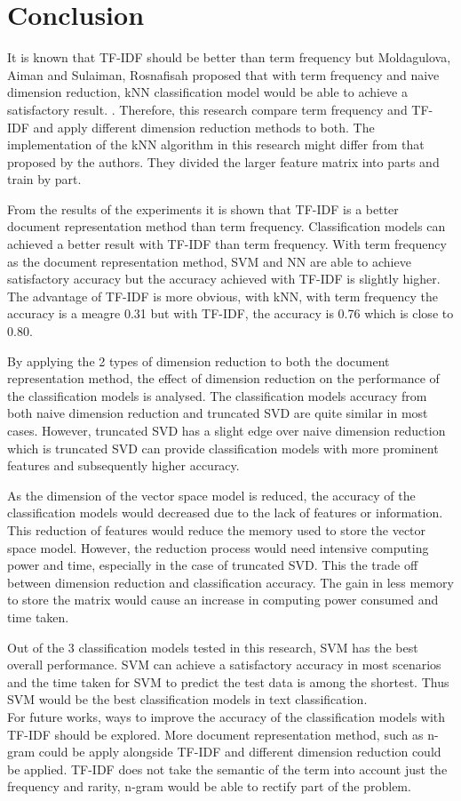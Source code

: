 \chapter{Conclusion}
It is known that TF-IDF should be better than term frequency but Moldagulova, Aiman and Sulaiman, Rosnafisah proposed that with term frequency and naive dimension reduction, kNN classification model would be able to achieve a satisfactory result. \cite{knnVectorSpaceReduction}. Therefore, this research compare term frequency and TF-IDF and apply different dimension reduction methods to both. The implementation of the kNN algorithm in this research might differ from that proposed by the authors. They divided the larger feature matrix into parts and train by part.

From the results of the experiments it is shown that TF-IDF is a better document representation method than term frequency. Classification models can achieved a better result with TF-IDF than term frequency.
With term frequency as the document representation method, SVM and NN are able to achieve satisfactory accuracy but the accuracy achieved with TF-IDF is slightly higher. The advantage of TF-IDF is more obvious, with kNN, with term frequency the accuracy is a meagre 0.31 but with TF-IDF, the accuracy is 0.76 which is close to 0.80.

By applying the 2 types of dimension reduction to both the document representation method, the effect of dimension reduction on the performance of the classification models is analysed. The classification models accuracy from both naive dimension reduction and truncated SVD are quite similar in most cases. However, truncated SVD has a slight edge over naive dimension reduction which is truncated SVD can provide classification models with more prominent features and subsequently higher accuracy.

As the dimension of the vector space model is reduced, the accuracy of the classification models would decreased due to the lack of features or information. This reduction of features would reduce the memory used to store the vector space model. However, the reduction process would need intensive computing power and time, especially in the case of truncated SVD. This the trade off between dimension reduction and classification accuracy. The gain in less memory to store the matrix would cause an increase in computing power consumed and time taken.

Out of the 3 classification models tested in this research, SVM has the best overall performance. SVM can achieve a satisfactory accuracy in most scenarios and the time taken for SVM to predict the test data is among the shortest. Thus SVM would be the best classification models in text classification.\\

For future works, ways to improve the accuracy of the classification models with TF-IDF should be explored. More document representation method, such as n-gram could be apply alongside TF-IDF and different dimension reduction could be applied. TF-IDF does not take the semantic of the term into account just the frequency and rarity, n-gram would be able to rectify part of the problem.